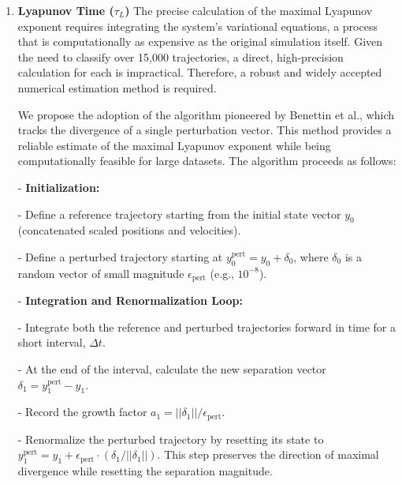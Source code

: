 \documentclass[11pt, a4paper]{article}
\begin{document}
\begin{enumerate}
- \textbf{Calculate Normalized Ratio:} The final dimensionless ratio is then $L_{\text{norm}} = L / L_{\max}$.
    
    This approach correctly captures the physical intuition that for a fixed energy, maximum angular momentum corresponds to circular motion, where kinetic energy is maximized at the largest stable separation.

    \item \textbf{Lyapunov Time ($\tau_L$)}
    The precise calculation of the maximal Lyapunov exponent requires integrating the system's variational equations, a process that is computationally as expensive as the original simulation itself. Given the need to classify over 15,000 trajectories, a direct, high-precision calculation for each is impractical. Therefore, a robust and widely accepted numerical estimation method is required.

    We propose the adoption of the algorithm pioneered by Benettin et al., which tracks the divergence of a single perturbation vector. This method provides a reliable estimate of the maximal Lyapunov exponent while being computationally feasible for large datasets. The algorithm proceeds as follows:
    
        
- \textbf{Initialization:}
        
            
- Define a reference trajectory starting from the initial state vector $y_0$ (concatenated scaled positions and velocities).
            
- Define a perturbed trajectory starting at $y_0^{\text{pert}} = y_0 + \delta_0$, where $\delta_0$ is a random vector of small magnitude $\epsilon_{\text{pert}}$ (e.g., $10^{-8}$).
        
        
- \textbf{Integration and Renormalization Loop:}
        
            
- Integrate both the reference and perturbed trajectories forward in time for a short interval, $\Delta t$.
            
- At the end of the interval, calculate the new separation vector $\delta_1 = y_1^{\text{pert}} - y_1$.
            
- Record the growth factor $a_1 = ||\delta_1|| / \epsilon_{\text{pert}}$.
            
- Renormalize the perturbed trajectory by resetting its state to $y_1^{\text{pert}} = y_1 + \epsilon_{\text{pert}} \cdot (\delta_1 / ||\delta_1||)$. This step preserves the direction of maximal divergence while resetting the separation magnitude.
        

\end{enumerate}
\end{document}

